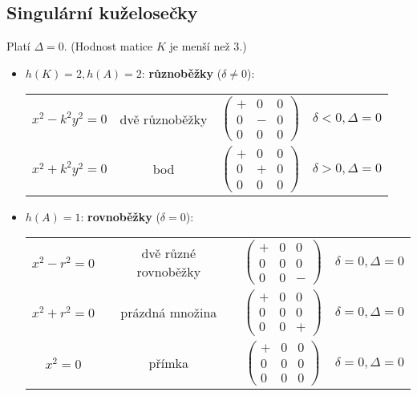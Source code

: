 \subsection*{Singulární kuželosečky}
Platí $\Delta = 0.$ (Hodnost matice $K$ je menší než 3.)

\begin{itemize}
\item $h(K)=2, h(A)=2$: \textbf{různoběžky} ($\delta \ne 0$):
\begin{center}
    \begin{tabular}{c c c c}
        $x^2-k^2y^2=0$ & dvě různoběžky & $\begin{pmatrix}
            + & 0 & 0 \\
            0 & - & 0 \\
            0 & 0 & 0
        \end{pmatrix}$ & $\delta <0, \Delta =0$ \\[1cm]
        $x^2+k^2y^2=0$ & bod & $\begin{pmatrix}
            + & 0 & 0 \\
            0 & + & 0 \\
            0 & 0 & 0
        \end{pmatrix}$ & $\delta >0, \Delta =0$
    \end{tabular}
\end{center}
\item $h(A)=1$: \textbf{rovnoběžky} ($\delta = 0$):
\begin{center}
    \begin{tabular}{c c c c}
        $x^2-r^2 = 0$ & dvě různé rovnoběžky & $\begin{pmatrix}
            + & 0 & 0  \\
            0 & 0 & 0 \\
            0 & 0 & -
        \end{pmatrix}$ & $\delta =0, \Delta =0$ \\[1cm]
        $x^2+r^2 = 0$ & prázdná množina & $\begin{pmatrix}
            + & 0 & 0  \\
            0 & 0 & 0 \\
            0 & 0 & +
        \end{pmatrix}$ & $\delta =0, \Delta =0$ \\[1cm]
        $x^2 = 0$ & přímka & $\begin{pmatrix}
            + & 0 & 0  \\
            0 & 0 & 0 \\
            0 & 0 & 0
        \end{pmatrix}$ & $\delta =0, \Delta =0$
    \end{tabular}
\end{center}
\end{itemize}

